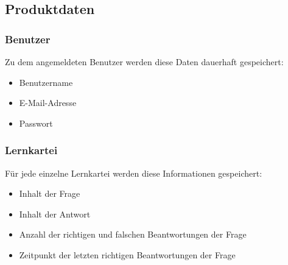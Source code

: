 \subsection{Produktdaten}
\subsubsection{Benutzer}
Zu dem angemeldeten Benutzer werden diese Daten dauerhaft gespeichert:
\begin{itemize}
	\item Benutzername
	\item E-Mail-Adresse
	\item Passwort
\end{itemize}

\subsubsection{Lernkartei}
Für jede einzelne Lernkartei werden diese Informationen gespeichert:
\begin{itemize}
	\item Inhalt der Frage
	\item Inhalt der Antwort
	\item Anzahl der richtigen und falschen Beantwortungen der Frage
	\item Zeitpunkt der letzten richtigen Beantwortungen der Frage
\end{itemize}


